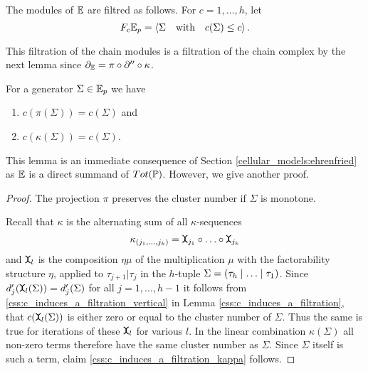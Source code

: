 \begin{defi}
    \label{css:cluster_filtration_of_E}
    The modules of $\E$ are filtred as follows.
    For $c = 1, \ldots, h$, let
    \[
        F_c\E_p = \langle  \Sigma \mspc{with}{10} c(\Sigma) \leq c \rangle \,.
    \]
\end{defi}

This filtration of the chain modules is a filtration of the chain complex by the next lemma since $\del_\E = \pi \circ \del'' \circ \kappa$.

\begin{lem}
    \label{css:c_induces_a_filtration_ehr}
    For a generator $\Sigma \in \E_p$ we have
    \begin{enumerate}
        \item \label{css:c_induces_a_filtration_pi} $c( \pi (\Sigma) ) = c( \Sigma)$ and
        \item \label{css:c_induces_a_filtration_kappa} $c( \kappa( \Sigma ) ) = c( \Sigma )$.
    \end{enumerate}
\end{lem}
This lemma is an immediate consequence of Section \ref{cellular_models:ehrenfried} as $\E$ is a direct summand of $Tot(\PP)$.
However, we give another proof.
\begin{proof}
    The projection $\pi$ preserves the cluster number if $\Sigma$ is monotone.
    
    Recall that $\kappa$ is the alternating sum of all $\kappa$-sequences
    \[
        \kappa_{(j_1, \ldots, j_k)} = \mueta_{j_1} \circ \ldots \circ \mueta_{j_k}
    \]
    and $\mueta_l$ is the composition $\eta\mu$ of the multiplication $\mu$ with the factorability structure $\eta$,
    applied to $\tau_{j+1} | \tau_j$ in the $h$-tuple $\Sigma = \inhom$.
    Since $d'_j( \mueta_l( \Sigma )) = d'_j( \Sigma )$ for all $j = 1, \ldots, h-1$ 
    it follows from \ref{css:c_induces_a_filtration_vertical} in Lemma \ref{css:c_induces_a_filtration},
    that $c(\mueta_l( \Sigma))$ is either zero or equal to the cluster number of $\Sigma$.
    Thus the same is true for iterations of these $\mueta_l$ for various $l$. 
    In the linear combination $\kappa( \Sigma )$ all non-zero terms therefore have the same cluster number as $\Sigma$.
    Since $\Sigma$ itself is such a term, claim \ref{css:c_induces_a_filtration_kappa} follows.
\end{proof}

